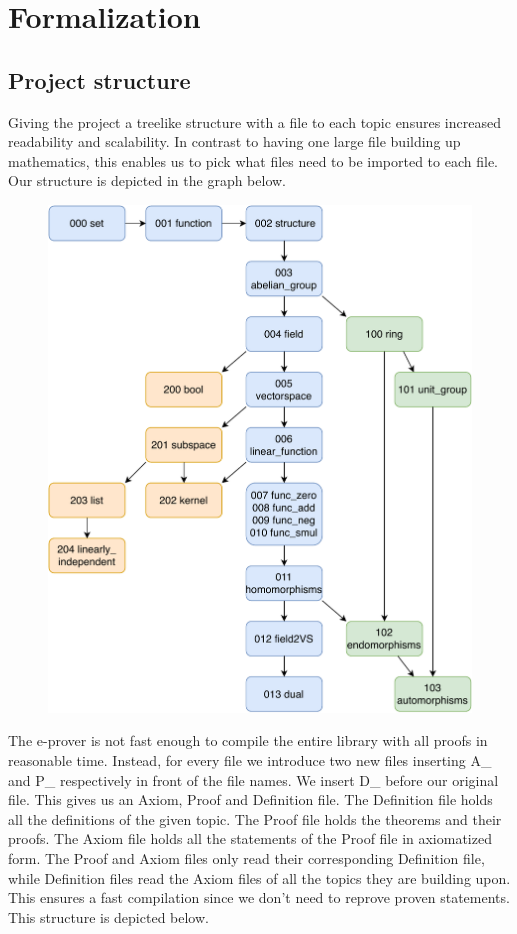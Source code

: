 \documentclass[11pt]{article}
\begin{document}
\newpage

\section{Formalization}
\subsection{Project structure}
Giving the project a treelike structure with a file to each topic ensures increased readability and scalability. 
In contrast to having one large file building up mathematics, this enables us to pick what files need to be imported to each file. 
Our structure is depicted in the graph below.

\begin{figure}[h]
\begin{center}
\includegraphics[scale=0.75]{./project_structure.pdf}
\end{center}
\end{figure}

\newpage

The e-prover is not fast enough to compile the entire library with all proofs in reasonable time. 
Instead, for every file we introduce two new files inserting A\_ and P\_ respectively in front of the file names. We insert D\_ before our original file. This gives us an Axiom, Proof and Definition file. 
The Definition file holds all the definitions of the given topic. 
The Proof file holds the theorems and their proofs. The Axiom file holds all the statements of the Proof file in axiomatized form. 
The Proof and Axiom files only read their corresponding Definition file, while Definition files read the Axiom files of all the topics they are building upon. 
This ensures a fast compilation since we don't need to reprove proven statements. 
This structure is depicted below.
\end{document}
